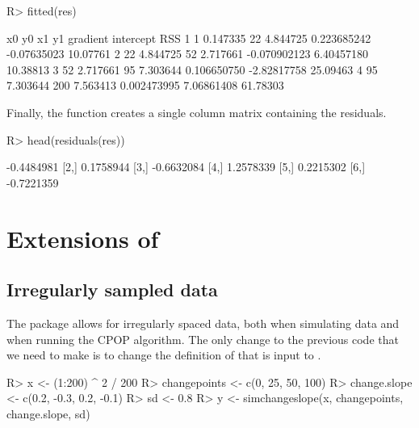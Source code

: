 \documentclass[article]{jss}
\begin{document}
\begin{CodeChunk}
\begin{CodeInput}
R> fitted(res)
\end{CodeInput}
\begin{CodeOutput}
  x0       y0  x1       y1     gradient   intercept      RSS
1  1 0.147335  22 4.844725  0.223685242 -0.07635023 10.07761
2 22 4.844725  52 2.717661 -0.070902123  6.40457180 10.38813
3 52 2.717661  95 7.303644  0.106650750 -2.82817758 25.09463
4 95 7.303644 200 7.563413  0.002473995  7.06861408 61.78303
\end{CodeOutput}
\end{CodeChunk}
%
%
Finally, the function   creates a single column matrix containing the residuals.
\newpage
\begin{CodeChunk}
\begin{CodeInput}
R> head(residuals(res))
\end{CodeInput}
\begin{CodeOutput}
           [,1]
[1,] -0.4484981
[2,]  0.1758944
[3,] -0.6632084
[4,]  1.2578339
[5,]  0.2215302
[6,] -0.7221359
\end{CodeOutput}
\end{CodeChunk}

\section[Extensions of {cpop}]{Extensions of } \label{sec:extensions}

\subsection{Irregularly sampled data}

The  package allows for irregularly spaced data, both when simulating data and when running the CPOP algorithm. The only change to the previous code that we need to make is to change the definition of  that is input to .

\begin{CodeChunk}
\begin{CodeInput}
R> x <- (1:200) ^ 2 / 200
R> changepoints <- c(0, 25, 50, 100)
R> change.slope <- c(0.2, -0.3, 0.2, -0.1)
R> sd <- 0.8
R> y <- simchangeslope(x, changepoints, change.slope, sd)
\end{CodeInput}
\end{CodeChunk}
\end{document}
